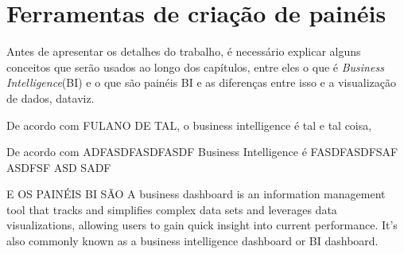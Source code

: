 \chapter{Ferramentas de criação de painéis}\label{cap_trabalho_academico}

Antes de apresentar os detalhes do trabalho, é necessário explicar alguns conceitos que serão usados ao longo dos capítulos, entre eles o que é \textit{Business Intelligence}(BI) e o que são painéis BI e as diferenças entre isso e a visualização de dados, dataviz.

De acordo com FULANO DE TAL, o business intelligence é tal e tal coisa, 


De acordo com ADFASDFASDFASDF Business Intelligence é FASDFASDFSAF ASDFSF ASD SADF

E OS PAINÉIS BI SÃO A business dashboard is an information management tool that tracks and simplifies complex data sets and leverages data visualizations, allowing users to gain quick insight into current performance. It's also commonly known as a business intelligence dashboard or BI dashboard.
